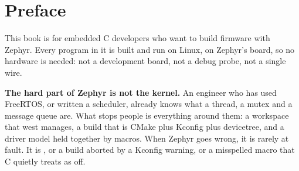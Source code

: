 
\chapter{Preface}

This book is for embedded C developers who want to build firmware with Zephyr. Every program in it
is built and run on Linux, on Zephyr's  board, so no hardware is needed: not a
development board, not a debug probe, not a single wire.

\textbf{The hard part of Zephyr is not the kernel.} An engineer who has used FreeRTOS, or written a
scheduler, already knows what a thread, a mutex and a message queue are. What stops people is
everything around them: a workspace that west manages, a build that is CMake plus Kconfig plus
devicetree, and a driver model held together by macros. When Zephyr goes wrong, it is rarely
 at fault. It is , or a
build aborted by a Kconfig warning, or a misspelled  macro that C quietly treats as
off.

